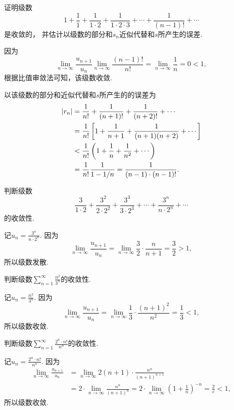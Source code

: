 \begin{example}\label{example:无穷级数.常数e的级数表示}
证明级数\[
	1+\frac{1}{1}+\frac{1}{1\cdot2}+\frac{1}{1\cdot2\cdot3}+\dotsb+\frac{1}{(n-1)!}+\dotsb
\]是收敛的，
并估计以级数的部分和\(s_n\)近似代替和\(s\)所产生的误差.
\begin{solution}
因为\[
	\lim_{n\to\infty} \frac{u_{n+1}}{u_n}
	 \lim_{n\to\infty} \frac{(n-1)!}{n!}
	= \lim_{n\to\infty} \frac{1}{n} = 0 < 1,
\]
根据比值审敛法可知，该级数收敛.

以该级数的部分和近似代替和\(s\)所产生的的误差为\begin{align*}
	\abs{r_n} &= \frac{1}{n!} + \frac{1}{(n+1)!} + \frac{1}{(n+2)!} + \dotsb \\
	&= \frac{1}{n!} \left[ 1 + \frac{1}{n+1} + \frac{1}{(n+1)(n+2)} + \dotsb \right] \\
	&< \frac{1}{n!} \left( 1 + \frac{1}{n} + \frac{1}{n^2} + \dotsb \right) \\
	&= \frac{1}{n!} \frac{1}{1-1/n}
	= \frac{1}{(n-1)\cdot(n-1)!}.
\end{align*}
\end{solution}
\end{example}

\begin{example}
判断级数\[
	\frac{3}{1\cdot2}
	+\frac{3^2}{2\cdot2^2}
	+\frac{3^3}{3\cdot2^3}
	+\dotsb
	+\frac{3^n}{n\cdot2^n}
	+\dotsb
\]的收敛性.
\begin{solution}
记\(u_n = \frac{3^n}{n\cdot2^n}\).
因为\[
	\lim_{n\to\infty} \frac{u_{n+1}}{u_n}
	= \lim_{n\to\infty} \frac{3}{2}\cdot\frac{n}{n+1}
	= \frac{3}{2} > 1,
\]
所以级数发散.
\end{solution}
\end{example}

\begin{example}
判断级数\(\sum_{n=1}^\infty \frac{n^2}{3^n}\)的收敛性.
\begin{solution}
记\(u_n = \frac{n^2}{3^n}\).
因为\[
	\lim_{n\to\infty} \frac{u_{n+1}}{u_n}
	= \lim_{n\to\infty} \frac{1}{3} \cdot \frac{(n+1)^2}{n^2}
	= \frac{1}{3} < 1,
\]
所以级数收敛.
\end{solution}
\end{example}

\begin{example}
判断级数\(\sum_{n=1}^\infty \frac{2^n \cdot n!}{n^n}\)的收敛性.
\begin{solution}
记\(u_n = \frac{2^n \cdot n!}{n^n}\).
因为\begin{align*}
	\lim_{n\to\infty} \frac{u_{n+1}}{u_n}
	&= \lim_{n\to\infty} 2(n+1) \cdot \frac{n^n}{(n+1)^{n+1}} \\
	&= 2 \cdot \lim_{n\to\infty} \frac{n^n}{(n+1)^n}
	= 2 \cdot \lim_{n\to\infty} \left(1+\frac{1}{n}\right)^{-n}
	= \frac2e < 1,
\end{align*}
所以级数收敛.
\end{solution}
\end{example}

